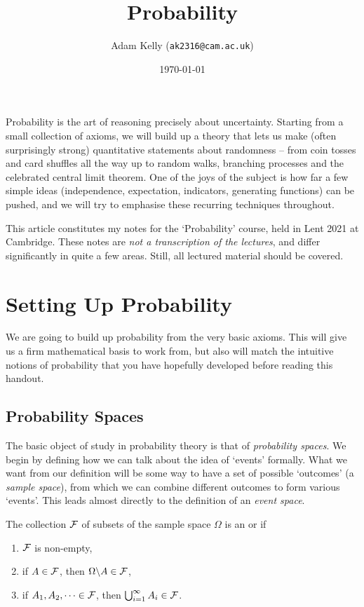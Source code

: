 \documentclass[a4paper]{scrartcl}
\title{Probability}
\author{Adam Kelly (\texttt{ak2316@cam.ac.uk})}
\date{\today}
\begin{document}
\maketitle


Probability is the art of reasoning precisely about uncertainty. Starting from a small collection of axioms, we will build up a theory that lets us make (often surprisingly strong) quantitative statements about randomness -- from coin tosses and card shuffles all the way up to random walks, branching processes and the celebrated central limit theorem. One of the joys of the subject is how far a few simple ideas (independence, expectation, indicators, generating functions) can be pushed, and we will try to emphasise these recurring techniques throughout.

This article constitutes my notes for the `Probability' course, held in Lent 2021 at Cambridge. These notes are \emph{not a transcription of the lectures}, and differ significantly in quite a few areas. Still, all lectured material should be covered.

\tableofcontents

\section{Setting Up Probability}

We are going to build up probability from the very basic axioms. This will give us a firm mathematical basis to work from, but also will match the intuitive notions of probability that you have hopefully developed before reading this handout.

\subsection{Probability Spaces}

The basic object of study in probability theory is that of \emph{probability spaces}. We begin by defining how we can talk about the idea of `events' formally. What we want from our definition will be some way to have a set of possible `outcomes' (a \emph{sample space}), from which we can combine different outcomes to form various `events'. This leads almost directly to the definition of an \emph{event space}.

\begin{definition} The collection $\mathcal{F}$ of subsets of the sample space $\Omega$ is an  or  if
	\begin{enumerate}
		\item $\mathcal{F}$ is non-empty,
		\item if $A \in \mathcal{F}$, then $\Omega \backslash A \in \mathcal{F}$,
		\item if $A_1, A_2, \dots \in \mathcal{F}$, then $\bigcup_{i = 1}^{\infty} A_i \in \mathcal{F}$.
	\end{enumerate}
\end{definition}
\end{document}
